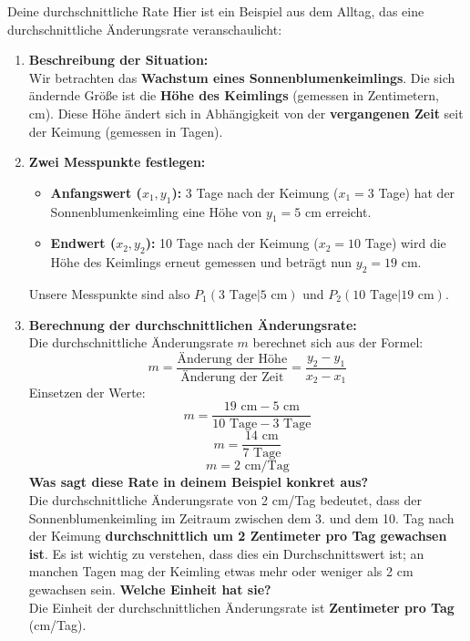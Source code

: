 \begin{loesungsumgebung}{Deine durchschnittliche Rate}
Hier ist ein Beispiel aus dem Alltag, das eine durchschnittliche Änderungsrate veranschaulicht:

\begin{enumerate}
    \item \textbf{Beschreibung der Situation:} \\
    Wir betrachten das \textbf{Wachstum eines Sonnenblumenkeimlings}.
    Die sich ändernde Größe ist die \textbf{Höhe des Keimlings} (gemessen in Zentimetern, cm).
    Diese Höhe ändert sich in Abhängigkeit von der \textbf{vergangenen Zeit} seit der Keimung (gemessen in Tagen).

    \item \textbf{Zwei Messpunkte festlegen:}
    \begin{itemize}
        \item \textbf{Anfangswert ($x_1, y_1$):} 3 Tage nach der Keimung ($x_1 = 3$ Tage) hat der Sonnenblumenkeimling eine Höhe von $y_1 = 5$ cm erreicht.
        \item \textbf{Endwert ($x_2, y_2$):} 10 Tage nach der Keimung ($x_2 = 10$ Tage) wird die Höhe des Keimlings erneut gemessen und beträgt nun $y_2 = 19$ cm.
    \end{itemize}
    Unsere Messpunkte sind also $P_1(3 \text{ Tage} | 5 \text{ cm})$ und $P_2(10 \text{ Tage} | 19 \text{ cm})$.

    \item \textbf{Berechnung der durchschnittlichen Änderungsrate:} \\
    Die durchschnittliche Änderungsrate $m$ berechnet sich aus der Formel:
    $$ m = \frac{\text{Änderung der Höhe}}{\text{Änderung der Zeit}} = \frac{y_2 - y_1}{x_2 - x_1} $$
    Einsetzen der Werte:
    $$ m = \frac{19 \text{ cm} - 5 \text{ cm}}{10 \text{ Tage} - 3 \text{ Tage}} $$
    $$ m = \frac{14 \text{ cm}}{7 \text{ Tage}} $$
    $$ m = 2 \text{ cm/Tag} $$
    \textbf{Was sagt diese Rate in deinem Beispiel konkret aus?} \\
    Die durchschnittliche Änderungsrate von 2 cm/Tag bedeutet, dass der Sonnenblumenkeimling im Zeitraum zwischen dem 3. und dem 10. Tag nach der Keimung \textbf{durchschnittlich um 2 Zentimeter pro Tag gewachsen ist}. Es ist wichtig zu verstehen, dass dies ein Durchschnittswert ist; an manchen Tagen mag der Keimling etwas mehr oder weniger als 2 cm gewachsen sein.
    \textbf{Welche Einheit hat sie?} \\
    Die Einheit der durchschnittlichen Änderungsrate ist \textbf{Zentimeter pro Tag} (cm/Tag).
\end{enumerate}


\end{loesungsumgebung}
